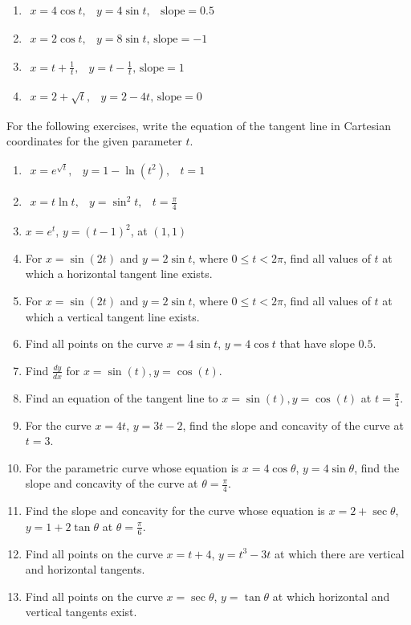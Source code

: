 \documentclass{exercises}
\begin{document}
\begin{enumerate}[resume]
\item $\begin{matrix}x=4\cos t, & y=4\sin t, & \text{slope}=0.5\end{matrix}$
\item $\begin{matrix}x=2\cos t, & y=8\sin t,\,\text{slope}=-1\end{matrix}$
\item $\begin{matrix}x=t+\frac{1}{t}, & y=t-\frac{1}{t},\,\text{slope}=1\end{matrix}$
\item $\begin{matrix}x=2+\sqrt{t}, & y=2-4t,\,\text{slope}=0\end{matrix}$
\end{enumerate}

For the following exercises, write the equation of the tangent line in Cartesian coordinates for the given parameter $t$.

\begin{enumerate}[resume]
\item $\begin{matrix}x=e^{\sqrt{t}}, & y=1-\ln(t^{2}), & t=1\end{matrix}$
\item $\begin{matrix}x=t\ln t, & y=\sin^{2}t, & t=\frac{\pi}{4}\end{matrix}$
\item $x=e^{t}$, $y=(t-1)^{2}$, at $(1,1)$
\item For $x=\sin(2t)$ and $y=2\sin t$, where $0\le t<2\pi$, find all values of $t$ at which a horizontal tangent line exists.
\item For $x=\sin(2t)$ and $y=2\sin t$, where $0\le t<2\pi$, find all values of $t$ at which a vertical tangent line exists.
\item Find all points on the curve $x=4\sin t$, $y=4\cos t$ that have slope $0.5$.
\item Find $\frac{dy}{dx}$ for $x=\sin(t),y=\cos(t)$.
\item Find an equation of the tangent line to $x=\sin(t),y=\cos(t)$ at $t=\frac{\pi}{4}$.
\item For the curve $x=4t$, $y=3t-2$, find the slope and concavity of the curve at $t=3$.
\item For the parametric curve whose equation is $x=4\cos \theta$, $y=4\sin \theta$, find the slope and concavity of the curve at $\theta=\frac{\pi}{4}$.
\item Find the slope and concavity for the curve whose equation is $x=2+\sec \theta$, $y=1+2\tan \theta$ at $\theta=\frac{\pi}{6}$.
\item Find all points on the curve $x=t+4$, $y=t^{3}-3t$ at which there are vertical and horizontal tangents.
\item Find all points on the curve $x=\sec \theta$, $y=\tan \theta$ at which horizontal and vertical tangents exist.
\end{enumerate}
\end{document}
